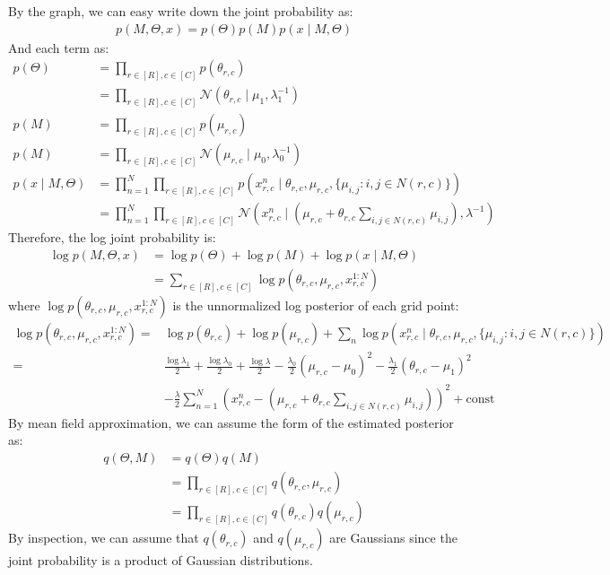 \documentclass[12pt]{article}
\newenvironment{problem}[2][Problem]{\begin{trivlist}
\item[\hskip \labelsep {\bfseries #1}\hskip \labelsep {\bfseries #2.}]}{\end{trivlist}}
\begin{document}
\begin{problem}{2.9.25}
By the graph, we can easy write down the joint probability as:
\begin{align*}
    p(M, \Theta, x) = p(\Theta)p(M)p(x \mid M, \Theta)
\end{align*}
And each term as:
\begin{align*}
    p(\Theta) &= \prod_{r \in [R], c\in [C]} p(\theta_{r,c}) \\
        &= \prod_{r \in [R], c\in [C]} \mathcal{N}(\theta_{r,c}\mid \mu_{1}, \lambda_{1}^{-1}) \\
    p(M) &= \prod_{r \in [R], c\in [C]} p(\mu_{r,c}) \\
    p(M) &= \prod_{r \in [R], c\in [C]} \mathcal{N}(\mu_{r,c}\mid \mu_{0}, \lambda_{0}^{-1}) \\
    p(x \mid M, \Theta)
        &= \prod_{n=1}^{N}\prod_{r \in [R], c\in [C]} 
                p(x^{n}_{r,c}\mid \theta_{r,c}, \mu_{r,c}, \{\mu_{i,j}: i, j \in N(r,c)\})\\
        &= \prod_{n=1}^{N}\prod_{r \in [R], c\in [C]} \mathcal{N}(x^{n}_{r,c} \mid  
            (\mu_{r,c} + \theta_{r,c}\sum_{i,j \in N(r,c)}\mu_{i,j}), \lambda^{-1})
\end{align*}
Therefore, the log joint probability is:
\begin{align*}
    \log p(M, \Theta, x) &= \log p(\Theta) + \log p(M) + \log p(x \mid M, \Theta) \\
        & = \sum_{r \in [R], c\in [C]} \log p(\theta_{r,c}, \mu_{r,c}, x^{1:N}_{r,c})
\end{align*}
where $\log p(\theta_{r,c}, \mu_{r,c}, x^{1:N}_{r,c})$ is the unnormalized log posterior
of each grid point:
\begin{align*}
    \log p(\theta_{r,c}, \mu_{r,c}, x^{1:N}_{r,c}) =& 
    \log p(\theta_{r,c}) + \log p(\mu_{r,c}) 
        + \sum_{n} \log p(x^{n}_{r,c}\mid \theta_{r,c}, \mu_{r,c}, \{\mu_{i,j}: i, j \in N(r,c)\}) \\
    =& \frac{\log \lambda_1}{2} + \frac{\log \lambda_0}{2} + \frac{\log \lambda}{2} 
       - \frac{\lambda_0}{2}(\mu_{r,c} - \mu_0)^2 - \frac{\lambda_1}{2}(\theta_{r,c} - \mu_1)^2 \\
     & - \frac{\lambda}{2}\sum_{n=1}^{N}(x^n_{r,c} - (\mu_{r,c} + \theta_{r,c}\sum_{i,j \in N(r,c)}\mu_{i,j}))^2
       + \text{const}
\end{align*}
By mean field approximation, we can assume the form of the estimated posterior as:
\begin{align*}
    q(\Theta, M) &= q(\Theta)q(M) \\
                 &= \prod_{r \in [R], c\in [C]} q(\theta_{r,c}, \mu_{r,c}) \\
                 &= \prod_{r \in [R], c\in [C]} q(\theta_{r,c})q(\mu_{r,c})
\end{align*}
By inspection, we can assume that $q(\theta_{r,c})$ and $q(\mu_{r,c})$ are Gaussians
since the joint probability is a product of Gaussian distributions.


\end{problem}
\end{document}
